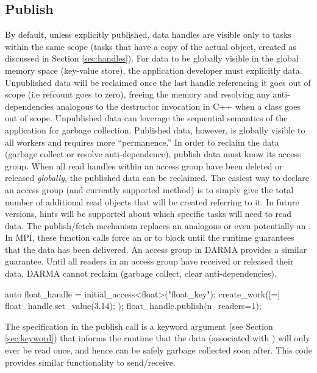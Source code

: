 \subsection{Publish}
\label{subsec:publish}
By default, unless explicitly published, data handles are visible only to tasks
within the same scope (tasks that have a copy of the actual
 object, created as discussed in
Section \ref{sec:handles}).
For data to be globally visible in the global memory space (key-value store),
the application developer must explicitly  data.  
Unpublished data will be reclaimed once the last handle referencing it goes out of scope (i.e refcount goes to zero),
freeing the memory and resolving any anti-dependencies analogous to the
destructor invocation in C++ when a class goes out of scope.  
Unpublished data can leverage the sequential semantics of the application for garbage collection.  
Published data, however, is globally visible to all workers and requires more ``permanence.''  
In order to reclaim the data (garbage collect or resolve anti-dependence), publish data must know its access group.
When all read handles within an access group have been deleted or released \emph{globally}, the published data can be reclaimed.
The easiest way to declare an access group (and currently supported method) is
to simply give the total number of additional read  objects that will be created referring to it.
In future versions, hints will be supported about which specific tasks will need to read data.
The publish/fetch mechanism replaces an analogous  or even potentially an .
In MPI, these function calls force an  or  to block until the runtime guarantees that the data has
been delivered.
An access group in DARMA provides a similar guarantee.
Until all readers in an access group have received or released their data, DARMA cannot reclaim (garbage collect, clear anti-dependencies).

\begin{CppCode}
auto float_handle = initial_access<float>("float_key");
create_work([=]{
  float_handle.set_value(3.14);
});
float_handle.publish(n_readers=1);
\end{CppCode}
The  specification in the publish call is a keyword
argument (see Section \ref{sec:keyword}) that informs the runtime that the data
(associated with ) will only ever be read once, and hence can be safely garbage collected soon after.  
This code provides similar functionality to send/receive.

